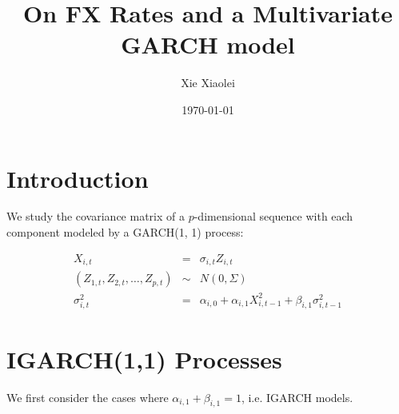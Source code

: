 \documentclass{article}
\title{On FX Rates and a Multivariate GARCH model}
\author{Xie Xiaolei}
\date{\today}
\begin{document}
\maketitle

\section{Introduction}
We study the covariance matrix of a $p$-dimensional sequence with each
component modeled by a GARCH(1, 1) process:

\begin{eqnarray*}
  X_{i,t} &=& \sigma_{i,t} Z_{i,t} \\
  (Z_{1, t}, Z_{2,t}, \dots, Z_{p,t}) &\sim& N(0, \Sigma) \\
  \sigma_{i, t}^2 &=& \alpha_{i,0} + \alpha_{i,1} X_{i, t-1}^2 + \beta_{i,1} \sigma_{i, t-1}^2
\end{eqnarray*}

\section{IGARCH(1,1) Processes}
We first consider the cases where $\alpha_{i, 1} + \beta_{i, 1} = 1$, i.e. IGARCH models.
\end{document}
